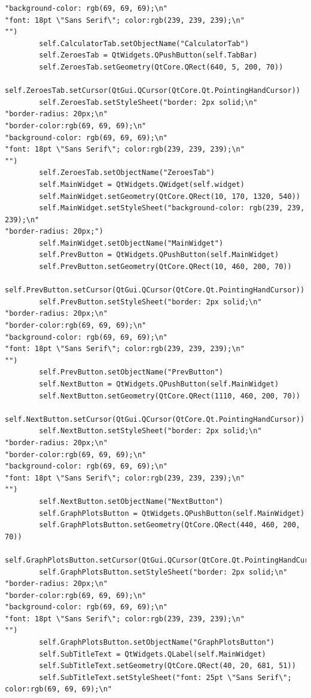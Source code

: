 \documentclass[12pt]{article}
\begin{document}
\begin{lstlisting}
"background-color: rgb(69, 69, 69);\n"
"font: 18pt \"Sans Serif\"; color:rgb(239, 239, 239);\n"
"")
        self.CalculatorTab.setObjectName("CalculatorTab")
        self.ZeroesTab = QtWidgets.QPushButton(self.TabBar)
        self.ZeroesTab.setGeometry(QtCore.QRect(640, 5, 200, 70))
        self.ZeroesTab.setCursor(QtGui.QCursor(QtCore.Qt.PointingHandCursor))
        self.ZeroesTab.setStyleSheet("border: 2px solid;\n"
"border-radius: 20px;\n"
"border-color:rgb(69, 69, 69);\n"
"background-color: rgb(69, 69, 69);\n"
"font: 18pt \"Sans Serif\"; color:rgb(239, 239, 239);\n"
"")
        self.ZeroesTab.setObjectName("ZeroesTab")
        self.MainWidget = QtWidgets.QWidget(self.widget)
        self.MainWidget.setGeometry(QtCore.QRect(10, 170, 1320, 540))
        self.MainWidget.setStyleSheet("background-color: rgb(239, 239, 239);\n"
"border-radius: 20px;")
        self.MainWidget.setObjectName("MainWidget")
        self.PrevButton = QtWidgets.QPushButton(self.MainWidget)
        self.PrevButton.setGeometry(QtCore.QRect(10, 460, 200, 70))
        self.PrevButton.setCursor(QtGui.QCursor(QtCore.Qt.PointingHandCursor))
        self.PrevButton.setStyleSheet("border: 2px solid;\n"
"border-radius: 20px;\n"
"border-color:rgb(69, 69, 69);\n"
"background-color: rgb(69, 69, 69);\n"
"font: 18pt \"Sans Serif\"; color:rgb(239, 239, 239);\n"
"")
        self.PrevButton.setObjectName("PrevButton")
        self.NextButton = QtWidgets.QPushButton(self.MainWidget)
        self.NextButton.setGeometry(QtCore.QRect(1110, 460, 200, 70))
        self.NextButton.setCursor(QtGui.QCursor(QtCore.Qt.PointingHandCursor))
        self.NextButton.setStyleSheet("border: 2px solid;\n"
"border-radius: 20px;\n"
"border-color:rgb(69, 69, 69);\n"
"background-color: rgb(69, 69, 69);\n"
"font: 18pt \"Sans Serif\"; color:rgb(239, 239, 239);\n"
"")
        self.NextButton.setObjectName("NextButton")
        self.GraphPlotsButton = QtWidgets.QPushButton(self.MainWidget)
        self.GraphPlotsButton.setGeometry(QtCore.QRect(440, 460, 200, 70))
        self.GraphPlotsButton.setCursor(QtGui.QCursor(QtCore.Qt.PointingHandCursor))
        self.GraphPlotsButton.setStyleSheet("border: 2px solid;\n"
"border-radius: 20px;\n"
"border-color:rgb(69, 69, 69);\n"
"background-color: rgb(69, 69, 69);\n"
"font: 18pt \"Sans Serif\"; color:rgb(239, 239, 239);\n"
"")
        self.GraphPlotsButton.setObjectName("GraphPlotsButton")
        self.SubTitleText = QtWidgets.QLabel(self.MainWidget)
        self.SubTitleText.setGeometry(QtCore.QRect(40, 20, 681, 51))
        self.SubTitleText.setStyleSheet("font: 25pt \"Sans Serif\"; color:rgb(69, 69, 69);\n"

\end{lstlisting}
\end{document}
